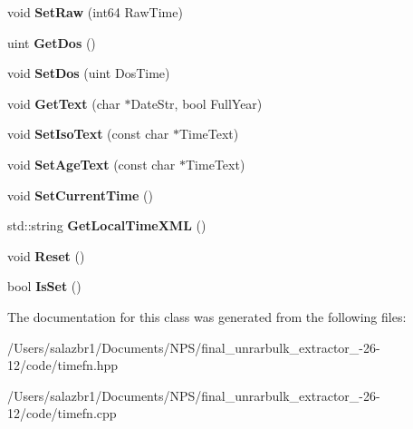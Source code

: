 \begin{DoxyCompactItemize}
\item 
\hypertarget{class_rar_time_a1879a1d3091c0ecb6865628b18564893}{void {\bfseries Set\-Raw} (int64 Raw\-Time)}\label{class_rar_time_a1879a1d3091c0ecb6865628b18564893}

\item 
\hypertarget{class_rar_time_a18a4f91d384feacefdbd2ceaa2964c55}{uint {\bfseries Get\-Dos} ()}\label{class_rar_time_a18a4f91d384feacefdbd2ceaa2964c55}

\item 
\hypertarget{class_rar_time_a0efa4b519c13394dd086e504a97085af}{void {\bfseries Set\-Dos} (uint Dos\-Time)}\label{class_rar_time_a0efa4b519c13394dd086e504a97085af}

\item 
\hypertarget{class_rar_time_a536860b5c8756ee0ff116cfe806ea5e3}{void {\bfseries Get\-Text} (char $\ast$Date\-Str, bool Full\-Year)}\label{class_rar_time_a536860b5c8756ee0ff116cfe806ea5e3}

\item 
\hypertarget{class_rar_time_a7d4133c5503560774d5be549f4549d7b}{void {\bfseries Set\-Iso\-Text} (const char $\ast$Time\-Text)}\label{class_rar_time_a7d4133c5503560774d5be549f4549d7b}

\item 
\hypertarget{class_rar_time_ab17a77662ab8d2961f85c2a0cb21aedb}{void {\bfseries Set\-Age\-Text} (const char $\ast$Time\-Text)}\label{class_rar_time_ab17a77662ab8d2961f85c2a0cb21aedb}

\item 
\hypertarget{class_rar_time_ac177f261789384edae956b3376903909}{void {\bfseries Set\-Current\-Time} ()}\label{class_rar_time_ac177f261789384edae956b3376903909}

\item 
\hypertarget{class_rar_time_a3faa4008398f4abe68294e9a113ca13c}{std\-::string {\bfseries Get\-Local\-Time\-X\-M\-L} ()}\label{class_rar_time_a3faa4008398f4abe68294e9a113ca13c}

\item 
\hypertarget{class_rar_time_af6064bc1f013b99b24f7931010483b08}{void {\bfseries Reset} ()}\label{class_rar_time_af6064bc1f013b99b24f7931010483b08}

\item 
\hypertarget{class_rar_time_addffbeddff095f118c0cd6121d408087}{bool {\bfseries Is\-Set} ()}\label{class_rar_time_addffbeddff095f118c0cd6121d408087}

\end{DoxyCompactItemize}


The documentation for this class was generated from the following files\-:\begin{DoxyCompactItemize}
\item 
/\-Users/salazbr1/\-Documents/\-N\-P\-S/final\-\_\-unrarbulk\-\_\-extractor\-\_-\/26-\/12/code/timefn.\-hpp\item 
/\-Users/salazbr1/\-Documents/\-N\-P\-S/final\-\_\-unrarbulk\-\_\-extractor\-\_-\/26-\/12/code/timefn.\-cpp\end{DoxyCompactItemize}

